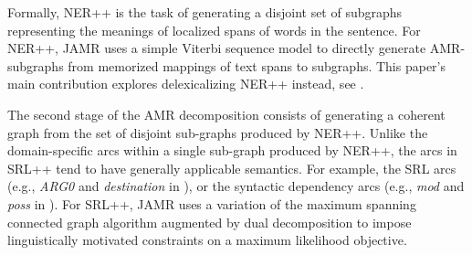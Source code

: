 \documentclass[11pt]{article}
\newcommand\e[1]{\textit{#1}} %
\begin{document}
Formally, NER++ is the task of generating a disjoint set of subgraphs representing the meanings of localized spans of words in the sentence.
For NER++, JAMR uses a simple Viterbi sequence model to directly generate AMR-subgraphs from memorized mappings of text spans to subgraphs.
This paper's main contribution explores delexicalizing NER++ instead, see .


The second stage of the AMR decomposition consists of generating a coherent graph
  from the set of disjoint sub-graphs produced by NER++.
Unlike the domain-specific arcs within a single sub-graph produced by NER++, the
  arcs in SRL++ tend to have generally applicable semantics.
For example, the SRL arcs (e.g., \e{ARG0} and \e{destination} in ),
  or the syntactic dependency arcs (e.g., \e{mod} and \e{poss} in ).
For SRL++, JAMR uses a variation of the maximum spanning connected graph algorithm augmented by dual decomposition to impose linguistically motivated constraints on a maximum likelihood objective. 
\end{document}
